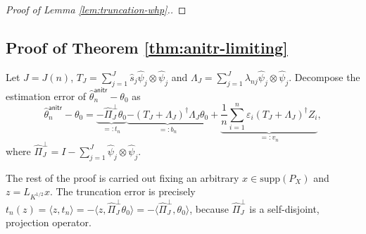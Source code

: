 \documentclass[11pt,a4paper]{article}
\renewcommand{\hat}{\widehat}
\theoremstyle{definition}
\theoremstyle{plain}
\theoremstyle{remark}
\newcommand{\supp}{\mathrm{supp}}
\newcommand{\ud}{\mathrm d}
\newcommand{\anitr}{\mathsf{anitr}}
\begin{document}
\begin{proof}[Proof of Lemma \ref{lem:truncation-whp}.]
\end{proof}

\subsection{Proof of Theorem \ref{thm:anitr-limiting}}

Let $J=J(n)$, $T_J=\sum_{j=1}^J \hat s_j\hat\psi_j\otimes \hat\psi_j$ and $\Lambda_J=\sum_{j=1}^J\lambda_{nj}\hat\psi_j\otimes\hat\psi_j$.
Decompose the estimation error of $\hat\theta_n^\anitr-\theta_0$ as
\begin{equation}
\hat\theta_n^\anitr-\theta_0 = \underbrace{-\hat\Pi_J^\perp\theta_0}_{=:t_n} \underbrace{-(T_J+\Lambda_J)^\dagger \Lambda_J\theta_0}_{=: b_n} + \underbrace{\frac{1}{n}\sum_{i=1}^n\varepsilon_i (T_J+\Lambda_J)^\dagger Z_i}_{=:v_n},
\label{eq:anitr-decomp}
\end{equation}
where $\hat\Pi_J^\perp = I - \sum_{j=1}^J\hat\psi_j\otimes\hat\psi_j$.

The rest of the proof is carried out fixing an arbitrary $x\in\supp(P_X)$ and $z=L_{K^{1/2}}x$. 
The truncation error is precisely $t_n(z)=\langle z, t_n\rangle = -\langle z, \hat\Pi_J^\perp\theta_0\rangle = -\langle \hat\Pi_J^\perp,\theta_0\rangle$, 
because $\hat\Pi_J^\perp$ is a self-disjoint, projection operator.
\end{document}
